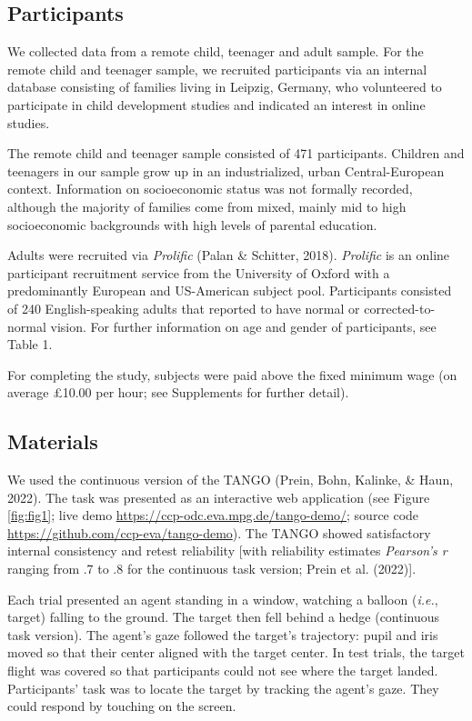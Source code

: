 \documentclass[
  man,floatsintext]{apa6}
\begin{document}
\hypertarget{participants}{%
\subsection{Participants}\label{participants}}

We collected data from a remote child, teenager and adult sample.
For the remote child and teenager sample, we recruited participants via an internal database consisting of families living in Leipzig, Germany, who volunteered to participate in child development studies and indicated an interest in online studies.

The remote child and teenager sample consisted of 471 participants.
Children and teenagers in our sample grow up in an industrialized, urban Central-European context.
Information on socioeconomic status was not formally recorded, although the majority of families come from mixed, mainly mid to high socioeconomic backgrounds with high levels of parental education.

Adults were recruited via \emph{Prolific} (Palan \& Schitter, 2018).
\emph{Prolific} is an online participant recruitment service from the University of Oxford with a predominantly European and US-American subject pool.
Participants consisted of 240 English-speaking adults that reported to have normal or corrected-to-normal vision.
For further information on age and gender of participants, see Table 1.

For completing the study, subjects were paid above the fixed minimum wage (on average £10.00 per hour; see Supplements for further detail).

\hypertarget{materials}{%
\subsection{Materials}\label{materials}}

We used the continuous version of the TANGO (Prein, Bohn, Kalinke, \& Haun, 2022).
The task was presented as an interactive web application (see Figure \ref{fig:fig1}; live demo \href{https://ccp-odc.eva.mpg.de/tango-demo/.}{https://ccp-odc.eva.mpg.de/tango-demo/}; source code \url{https://github.com/ccp-eva/tango-demo}).
The TANGO showed satisfactory internal consistency and retest reliability {[}with reliability estimates \emph{Pearson's r} ranging from .7 to .8 for the continuous task version; Prein et al. (2022){]}.

Each trial presented an agent standing in a window, watching a balloon (\emph{i.e.}, target) falling to the ground.
The target then fell behind a hedge (continuous task version).
The agent's gaze followed the target's trajectory: pupil and iris moved so that their center aligned with the target center.
In test trials, the target flight was covered so that participants could not see where the target landed.
Participants' task was to locate the target by tracking the agent's gaze.
They could respond by touching on the screen.
\end{document}
